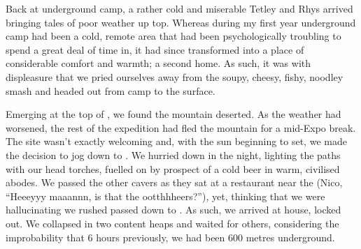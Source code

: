 Back at underground camp, a rather cold and miserable Tetley and Rhys
arrived bringing tales of poor weather up top. Whereas during my first
year underground camp had been a cold, remote area that had been
psychologically troubling to spend a great deal of time in, it had since
transformed into a place of considerable comfort and warmth; a second
home. As such, it was with displeasure that we pried ourselves away from
the soupy, cheesy, fishy, noodley smash and headed out from camp
 to the surface.

Emerging at the top of , we found the mountain deserted. As the
weather had worsened, the rest of the expedition had fled the mountain
for a mid-Expo break. The site wasn't exactly welcoming and, with the
sun beginning to set, we made the decision to jog down to . We
hurried down in the night, lighting the paths with our head torches,
fuelled on by prospect of a cold beer in warm, civilised abodes. We
passed the other cavers as they sat at a restaurant near the  (Nico, ``Heeeyyy maaannn, is that the ootthhheers?''), yet,
thinking that we were hallucinating we rushed passed down to . As
such, we arrived at  house, locked out. We collapsed in two
content heaps and waited for others, considering the improbability that
6 hours previously, we had been 600 metres underground.

